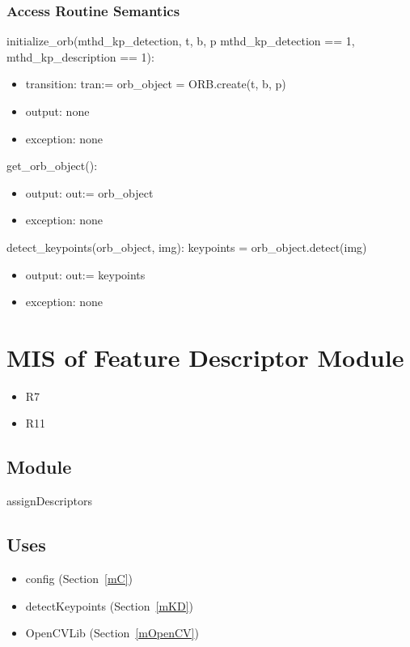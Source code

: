\documentclass[12pt, titlepage]{article}
\begin{document}
\subsubsection{Access Routine Semantics}

\noindent initialize\_orb(mthd\_kp\_detection, t, b, p 
\textbar \: mthd\_kp\_detection == 1, mthd\_kp\_description == 1):
\begin{itemize}
  \item transition: tran:= orb\_object = ORB.create(t, b, p) 
  \item output: none
  \item exception: none
\end{itemize}
\noindent get\_orb\_object():
\begin{itemize}
  \item output: out:= orb\_object
  \item exception: none
\end{itemize}
\noindent detect\_keypoints(orb\_object, img):\newline\newline
keypoints = orb\_object.detect(img)
\begin{itemize}
  \item output: out:= keypoints
  \item exception: none
\end{itemize}



\newpage
\section{MIS of Feature Descriptor Module} \label{mFD}
\begin{itemize}
  \item R7
  \item R11
\end{itemize}
\subsection{Module}

assignDescriptors

\subsection{Uses}
\begin{itemize}
  \item config (Section~\ref{mC})
  \item detectKeypoints (Section~\ref{mKD})
  \item OpenCVLib (Section~\ref{mOpenCV})
\end{itemize}
\end{document}
